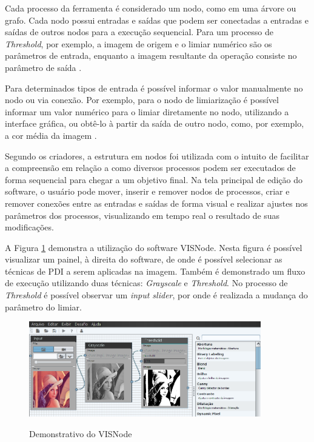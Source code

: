 \documentclass[
	12pt,				%
	oneside,			%
	a4paper,			%
	english,			%
	french,				%
	spanish,			%
	brazil,				%
	]{abntex2}
\begin{document}
Cada processo da ferramenta é considerado um nodo, como em uma árvore ou grafo. Cada nodo possui entradas e saídas que podem ser conectadas a entradas e saídas de outros nodos para a execução sequencial. Para um processo de \textit{Threshold}, por exemplo, a imagem de origem e o limiar numérico são os parâmetros de entrada, enquanto a imagem resultante da operação consiste no parâmetro de saída \cite{visnode}. 

Para determinados tipos de entrada é possível informar o valor manualmente no nodo ou via conexão. Por exemplo, para o nodo de limiarização é possível informar um valor numérico para o limiar diretamente no nodo, utilizando a interface gráfica, ou obtê-lo à partir da saída de outro nodo, como, por exemplo, a cor média da imagem \cite{visnode}.

Segundo os criadores, a estrutura em nodos foi utilizada com o intuito de facilitar a compreensão em relação a como diversos processos podem ser executados de forma sequencial para chegar a um objetivo final. Na tela principal de edição do software, o usuário pode mover, inserir e remover nodos de processos, criar e remover conexões entre as entradas e saídas de forma visual e realizar ajustes nos parâmetros dos processos, visualizando em tempo real o resultado de suas modificações.

A Figura \ref{fig:visnode} demonstra a utilização do software VISNode. Nesta figura é possível visualizar um painel, à direita do software, de onde é possível selecionar as técnicas de PDI a serem aplicadas na imagem. Também é demonstrado um fluxo de execução utilizando duas técnicas: \textit{Grayscale} e \textit{Threshold}. No processo de \textit{Threshold} é possível observar um \textit{input slider}, por onde é realizada a mudança do parâmetro do limiar.

\begin{figure}[ht]
\centering
\caption{Demonstrativo do VISNode}
\includegraphics[width=0.9\textwidth]{imagens/visnode.png}
\sourceAuthor
\label{fig:visnode}
\end{figure}
\end{document}
